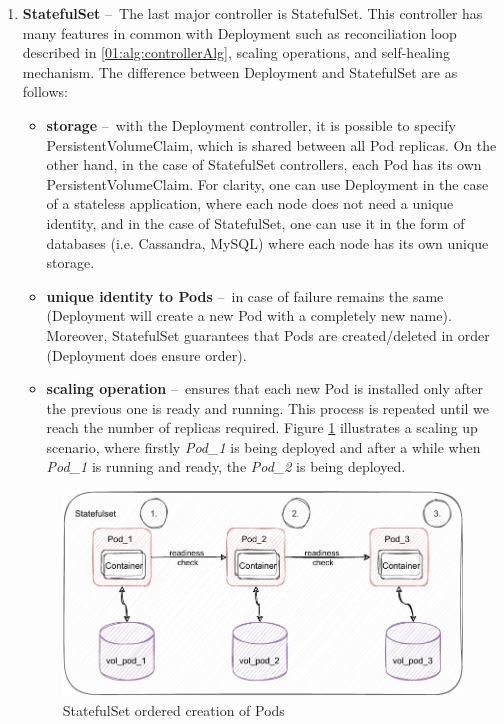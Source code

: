 \begin{enumerate}
    \item \textbf{StatefulSet} \---\ The last major controller is StatefulSet.
    This controller has many features in common with Deployment such as reconciliation loop described in \ref{01:alg:controllerAlg}, scaling operations, and self-healing mechanism.
    The difference between Deployment and StatefulSet are as follows:
    \begin{itemize}
        \item \textbf{storage} \---\ with the Deployment controller, it is possible to specify PersistentVolumeClaim, which is shared between all Pod replicas.
        On the other hand, in the case of StatefulSet controllers, each Pod has its own PersistentVolumeClaim.
        For clarity, one can use Deployment in the case of a stateless application, where each node does not need a unique identity, and in the case of StatefulSet, one can use it in the form of databases (i.e. Cassandra, MySQL) where each node has its own unique storage.
        \item \textbf{unique identity to Pods} \---\ in case of failure remains the same (Deployment will create a new Pod with a completely new name).
        Moreover, StatefulSet guarantees that Pods are created/deleted in order (Deployment does ensure order).
        \item \textbf{scaling operation} \---\  ensures that each new Pod is installed only after the previous one is ready and running.
        This process is repeated until we reach the number of replicas required.
        Figure \ref{02:fig:statefulsetOrderedCreation} illustrates a scaling up scenario, where firstly \emph{Pod\_1} is being deployed and after a while when \emph{Pod\_1} is running and ready, the \emph{Pod\_2} is being deployed.
    \end{itemize}

    \begin{figure}[!h]
        \centering
        \includegraphics[scale=1]{obrazky-figures/02-preliminaries/01-kubernetes/04-statefuset_with_volume.pdf}
        \caption{StatefulSet ordered creation of Pods}
        \label{02:fig:statefulsetOrderedCreation}
    \end{figure}


\end{enumerate}
